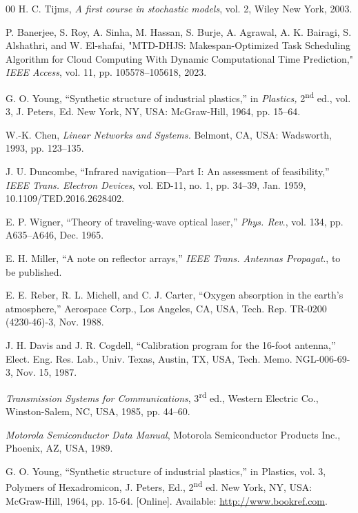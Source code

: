 \documentclass{ieeeaccess}
\begin{document}
\begin{thebibliography}{00}
 H. C. Tijms, \textit{A first course in stochastic models}, vol. 2, Wiley New York, 2003.

 P. Banerjee, S. Roy, A. Sinha, M. Hassan, S. Burje, A. Agrawal, A. K. Bairagi, S. Alshathri, and W. El-shafai, "MTD-DHJS: Makespan-Optimized Task Scheduling Algorithm for Cloud Computing With Dynamic Computational Time Prediction," \textit{IEEE Access}, vol. 11, pp. 105578--105618, 2023.




 G. O. Young, ``Synthetic structure of industrial plastics,'' in \emph{Plastics,} 2\textsuperscript{nd} ed., vol. 3, J. Peters, Ed. New York, NY, USA: McGraw-Hill, 1964, pp. 15--64.

 W.-K. Chen, \emph{Linear Networks and Systems.} Belmont, CA, USA: Wadsworth, 1993, pp. 123--135.

 J. U. Duncombe, ``Infrared navigation---Part I: An assessment of feasibility,'' \emph{IEEE Trans. Electron Devices}, vol. ED-11, no. 1, pp. 34--39, Jan. 1959, 10.1109/TED.2016.2628402.

 E. P. Wigner, ``Theory of traveling-wave optical laser,'' \emph{Phys. Rev}., vol. 134, pp. A635--A646, Dec. 1965.

 E. H. Miller, ``A note on reflector arrays,'' \emph{IEEE Trans. Antennas Propagat}., to be published.

 E. E. Reber, R. L. Michell, and C. J. Carter, ``Oxygen absorption in the earth's atmosphere,'' Aerospace Corp., Los Angeles, CA, USA, Tech. Rep. TR-0200 (4230-46)-3, Nov. 1988.

 J. H. Davis and J. R. Cogdell, ``Calibration program for the 16-foot antenna,'' Elect. Eng. Res. Lab., Univ. Texas, Austin, TX, USA, Tech. Memo. NGL-006-69-3, Nov. 15, 1987.

 \emph{Transmission Systems for Communications}, 3\textsuperscript{rd} ed., Western Electric Co., Winston-Salem, NC, USA, 1985, pp. 44--60.

 \emph{Motorola Semiconductor Data Manual}, Motorola Semiconductor Products Inc., Phoenix, AZ, USA, 1989.

 G. O. Young, ``Synthetic structure of industrial
plastics,'' in Plastics, vol. 3, Polymers of Hexadromicon, J. Peters,
Ed., 2\textsuperscript{nd} ed. New York, NY, USA: McGraw-Hill, 1964, pp. 15-64.
[Online]. Available:
\underline{http://www.bookref.com}.


\end{thebibliography}
\end{document}
